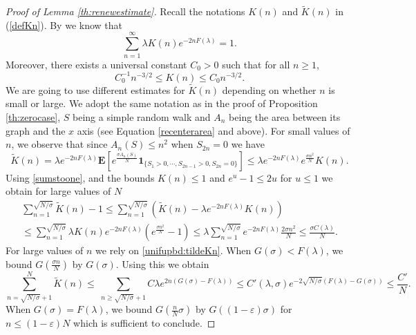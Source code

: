 \documentclass[reqno,11pt]{amsart}
\numberwithin{equation}{section}
\newcommand{\gep}{\varepsilon}       %
\newcommand{\gl}{\lambda}
\newcommand{\gs}{\sigma}
\newcommand{\bE}{{\ensuremath{\mathbf E}} }
\newcommand{\ind}{\mathbf{1}}
\renewcommand{\tilde}{\widetilde}
\begin{document}
\begin{proof}[Proof of Lemma \ref{th:renewestimate}] Recall the notations $K(n)$ and $\widetilde{K}(n)$  in (\ref{defKn}).
By \cite[Equation (1.6)]{GiacominPolymerbk}  we know that
\begin{equation}\label{sumstoone}
\sum_{n=1}^{\infty} \lambda K(n) e^{-2n F(\lambda)}=1.
\end{equation}
Moreover, there exists a universal constant $C_0>0$ such that for all $n\geq 1$,
\begin{equation}
C_0^{-1} n^{-3/2}\leq K(n)\leq C_0n^{-3/2}. \label{renewal induced by SRW}
\end{equation}
We are going to use different estimates for $\tilde K(n)$ depending on whether $n$ is small or large. 
We adopt the same notation as in the proof of Proposition \ref{th:zerocase}, $S$ being a simple random walk and $A_n$ being the area between its graph and the $x$ axis (see Equation \eqref{recenterarea} and above). For small values of $n$, we observe that since $A_n(S)\le n^2$ when $S_{2n}=0$   we have
\begin{equation}\label{upperkn}
 \tilde K(n)= \gl e^{-2n F(\gl)} \bE\left[ e^{\frac{\sigma A_n(S)}{N}}\ind_{\{ S_1>0, \cdots, S_{2n-1}>0, S_{2n}=0\}}\right]\le \gl  e^{-2n F(\gl)}e^{\frac{\sigma n^2}{N}} K(n).
\end{equation}
Using \eqref{sumstoone}, and the  bounds $K(n)\le 1$ and $e^u-1\le 2u$ for $u\le 1$ we obtain for large values of $N$
\begin{multline}\label{zecut}
\sum_{n=1}^{ \sqrt{N/\sigma}}  \widetilde{K}(n)-1
\le \sum_{n=1}^{\sqrt{N/\sigma}} \left( \widetilde{K}(n)-\gl e^{-2n F(\gl)}K(n)\right)
\\ \le \sum_{n=1}^{\sqrt{N/\sigma}}  \gl K(n) e^{-2n F(\gl)} \left(e^{\frac{\sigma n^2}{N}}-1\right)
\le \gl  \sum_{n=1}^{\sqrt{N/\sigma}} e^{-2n F(\gl)} \frac{2\sigma n^2}{N} \le \frac{\sigma C(\gl)}{N}.
\end{multline}
 For large values of $n$ we rely on  \eqref{unifupbd:tildeKn}.  
When  $G(\sigma)<F(\gl)$, we bound $G(\frac{\sigma n }{N})$ by $G(\sigma)$.
Using this we obtain
\begin{equation}\label{pindomupbound:bigjumps}
\sum_{n= \sqrt{N/\sigma}+1}^N \widetilde{K}(n) \le \  \sum_{n\geq  \sqrt{N/\sigma}+1}
C \gl e^{2n \left( G(\sigma)-F(\gl)\right)}\le C'(\gl,\sigma) e^{-2  \sqrt{N/\sigma} \left(F(\gl)- G(\sigma)\right) }\le \frac{C'}{N}.
\end{equation}
When $G(\sigma)=F(\gl)$,  we bound  $G(\frac{n}{N} \gs)$ by $G((1-\gep)\gs)$ for $n \le (1-\gep)N$
which is sufficient to conclude.
 \end{proof}
% 
\end{document}
